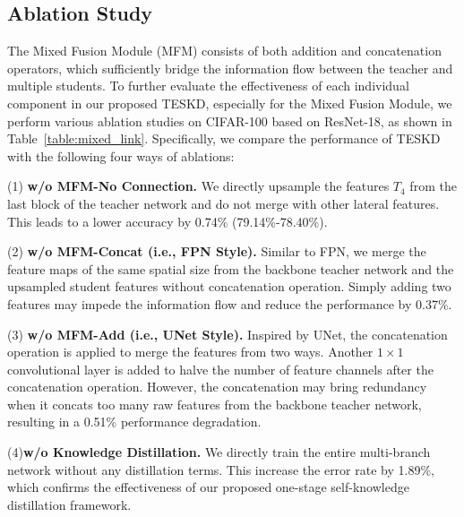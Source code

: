 \documentclass[letterpaper]{article} %
\begin{document}
\subsection{Ablation Study}


The Mixed Fusion Module (MFM) consists of both addition and concatenation operators, which sufficiently bridge the information flow between the teacher and multiple students. To further evaluate the effectiveness of each individual component in our proposed TESKD, especially for the Mixed Fusion Module, we perform various ablation studies on CIFAR-100 based on ResNet-18, as shown in Table~\ref{table:mixed_link}. Specifically, we compare the performance of TESKD with the following four ways of ablations: 

(1) \textbf{w/o MFM-No Connection.} We directly upsample the features $T_{4}$ from the last block of the teacher network and do not merge with other lateral features. This leads to a lower accuracy by 0.74\% (79.14\%-78.40\%).

(2) \textbf{w/o MFM-Concat (i.e., FPN Style).} Similar to FPN, we merge the feature maps of the same spatial size from the backbone teacher network and the upsampled student features without concatenation operation. Simply adding two features may impede the information flow and reduce the performance by 0.37\%.

(3) \textbf{w/o MFM-Add (i.e., UNet Style).} Inspired by UNet, the concatenation operation is applied to merge the features from two ways. Another $1\times1$ convolutional layer is added to halve the number of feature channels after the concatenation operation. However, the concatenation may bring redundancy when it concats too many raw features from the backbone teacher network, resulting in a 0.51\% performance degradation.

(4)\textbf{w/o Knowledge Distillation.} We directly train the entire multi-branch network without any distillation terms. This increase the error rate by 1.89\%, which confirms the effectiveness of our proposed one-stage self-knowledge distillation framework.
\end{document}
